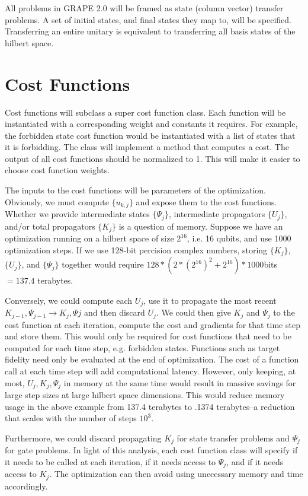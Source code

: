 \documentclass[letterpaper, 12pt]{article}
\begin{document}
All problems in GRAPE 2.0 will be framed as state (column vector) transfer problems. A set of initial states, and final states they map to, will be specified. Transferring an entire unitary is equivalent to transferring all basis states of the hilbert space.

\section{Cost Functions}
Cost functions will subclass a super cost function class. Each function will be instantiated with a corresponding weight and constants it requires. For example, the forbidden state cost function would be instantiated with a list of states that it is forbidding. The class will implement a method that computes a cost. The output of all cost functions should be normalized to 1. This will make it easier to choose cost function weights.

The inputs to the cost functions will be parameters of the optimization. Obviously, we must compute $\{u_{k, j}\}$ and expose them to the cost functions. Whether we provide intermediate states $\{\Psi_{j}\}$, intermediate propagators $\{U_{j}\}$, and/or total propagators $\{K_{j}\}$ is a question of memory. Suppose we have an optimization running on a hilbert space of size $2^{16}$, i.e. 16 qubits, and use 1000 optimization steps. If we use 128-bit percision complex numbers, storing $\{K_{j}\}$, $\{U_{j}\}$, and $\{\Psi_{j}\}$ together would require $128 * (2 * (2 ^{16})^{2} + 2^{16}) * 1000$bits $= 137.4$ terabytes.

Conversely, we could compute each $U_{j}$, use it to propagate the most recent $K_{j-1}, \Psi_{j-1} \rightarrow K_{j}, \Psi{j}$ and then discard $U_{j}$. We could then give $K_{j}$ and $\Psi_{j}$ to the cost function at each iteration, compute the cost and gradients for that time step and store them. This would only be required for cost functions that need to be computed for each time step, e.g. forbidden states. Functions such as target fidelity need only be evaluated at the end of optimization. The cost of a function call at each time step will add computational latency. However, only keeping, at most, $U_{j}, K_{j}, \Psi_{j}$ in memory at the same time would result in massive savings for large step sizes at large hilbert space dimensions. This would reduce memory usage in the above example from 137.4 terabytes to .1374 terabytes--a reduction that scales with the number of steps $10^{3}$.

Furthermore, we could discard propagating $K_{j}$ for state transfer problems and $\Psi_{j}$ for gate problems. In light of this analysis, each cost function class will specify if it needs to be called at each iteration, if it needs access to $\Psi_{j}$, and if it needs access to $K_{j}$. The optimization can then avoid using unecessary memory and time accordingly.
\end{document}
